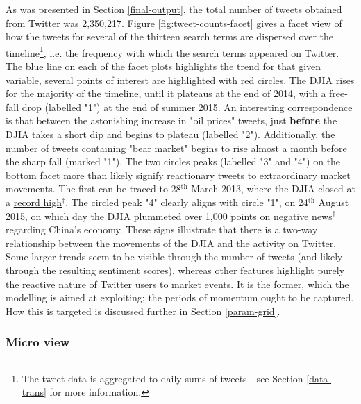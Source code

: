 \documentclass{article}
\begin{document}
As was presented in Section \ref{final-output}, the total number of tweets obtained from Twitter was 2,350,217. Figure \ref{fig:tweet-counts-facet} gives a facet view of how the tweets for several of the thirteen search terms are dispersed over the timeline\footnote{The tweet data is aggregated to daily sums of tweets - see Section \ref{data-trans} for more information.}, i.e. \hspace{-12pt} the frequency with which the search terms appeared on Twitter. The blue line on each of the facet plots highlights the trend for that given variable, several points of interest are highlighted with red circles. The DJIA rises for the majority of the timeline, until it plateaus at the end of 2014, with a free-fall drop (labelled "1") at the end of summer 2015. An interesting correspondence is that between the astonishing increase in "oil prices" tweets, just \textbf{before} the DJIA takes a short dip and begins to plateau (labelled "2"). Additionally, the number of tweets containing "bear market" begins to rise almost a month before the sharp fall (marked "1").
The two circles peaks (labelled "3" and "4") on the bottom facet more than likely signify reactionary tweets to extraordinary market movements. The first can be traced to 28$^{\text{th}}$ March 2013, where the DJIA closed at a \href{http://www.ibtimes.com/sp-500-dow-jones-industrial-average-stock-indexes-close-record-high-markets-recovery-1153105}{record high$^{\dag{}}$}. The circled peak "4" clearly aligns with circle "1", on 24$^{\text{th}}$ August 2015, on which day the DJIA plummeted over 1,000 points on \href{http://www.ibtimes.com/dow-jones-industrial-average-plummets-global-stocks-take-black-monday-plunge-great-2065359}{negative news$^{\dag{}}$} regarding China's economy. These signs illustrate that there is a two-way relationship between the movements of the DJIA and the activity on Twitter. Some larger trends seem to be visible through the number of tweets (and likely through the resulting sentiment scores), whereas other features highlight purely the reactive nature of Twitter users to market events. It is the former, which the modelling is aimed at exploiting; the periods of momentum ought to be captured. How this is targeted is discussed further in Section \ref{param-grid}.


\subsubsection{Micro view \label{micro-view}}
\label{sec-6-3-2}
\end{document}
